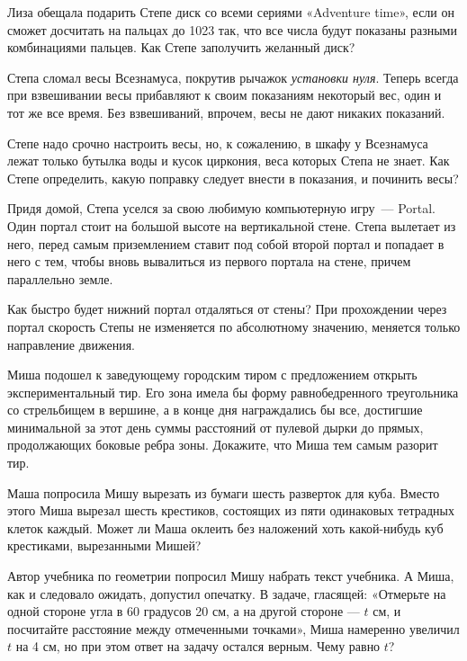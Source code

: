\begin{itemize}
\itA Лиза обещала подарить Степе диск со всеми сериями «Adventure time», если он сможет досчитать на пальцах до 1023 так, что все числа будут показаны разными комбинациями пальцев. Как Степе заполучить желанный диск?

\itB Степа сломал весы Всезнамуса, покрутив рычажок \emph{установки нуля}. 
Теперь всегда при взвешивании весы прибавляют к своим показаниям некоторый вес, один и тот же все время.
Без взвешиваний, впрочем, весы не дают никаких показаний.

Степе надо срочно настроить весы, но, к сожалению, в шкафу у Всезнамуса лежат только бутылка воды 
и кусок циркония, веса которых Степа не знает. 
Как Степе определить, какую поправку следует внести в показания, и починить весы?

\itC Придя домой, Степа уселся за свою любимую компьютерную игру~— Portal. 
Один портал стоит на большой высоте на вертикальной стене. Степа вылетает из него, перед самым 
приземлением ставит под собой второй портал и попадает в него с тем, чтобы вновь вывалиться 
из первого портала на стене, причем параллельно земле. 

Как быстро будет нижний портал отдаляться от стены? При прохождении через портал скорость Степы не изменяется
по абсолютному значению, меняется только направление движения.
\end{itemize}


\begin{itemize}
\itA Миша подошел к заведующему городским тиром с предложением открыть экспериментальный тир. Его зона имела бы форму равнобедренного треугольника со стрельбищем в вершине, а в конце дня награждались бы все, достигшие минимальной за этот день суммы расстояний от пулевой дырки до прямых, продолжающих боковые ребра зоны. Докажите, что Миша тем самым разорит тир.

\itB Маша попросила Мишу вырезать из бумаги шесть разверток для куба. Вместо этого Миша вырезал шесть крестиков, состоящих из пяти одинаковых тетрадных клеток каждый. Может ли Маша оклеить без наложений хоть какой-нибудь куб крестиками, вырезанными Мишей?

\itC Автор учебника по геометрии попросил Мишу набрать текст учебника. А Миша, как и следовало ожидать, допустил опечатку. В задаче, гласящей: «Отмерьте на одной стороне угла в 60 градусов 20 см, а на другой стороне — $t$ см, и посчитайте расстояние между отмеченными точками», Миша намеренно увеличил $t$ на 4 см, но при этом ответ на задачу остался верным. Чему равно $t$?
\end{itemize}
